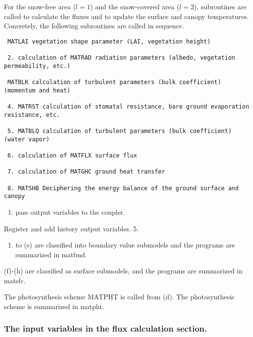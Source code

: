 For the snow-free area (\(l=1\)) and the snow-covered area (\(l=2\)),
subroutines are called to calculate the fluxes and to update the surface
and canopy temperatures. Concretely, the following subroutines are
called in sequence.

\begin{verbatim}
 MATLAI vegetation shape parameter (LAI, vegetation height)

 2. calculation of MATRAD radiation parameters (albedo, vegetation permeability, etc.)

 MATBLK calculation of turbulent parameters (bulk coefficient) (momentum and heat)

 4. MATRST calculation of stomatal resistance, bare ground evaporation resistance, etc.

 5. MATBLQ calculation of turbulent parameters (bulk coefficient) (water vapor)

 6. calculation of MATFLX surface flux

 7. calculation of MATGHC ground heat transfer

 8. MATSHB Deciphering the energy balance of the ground surface and canopy
\end{verbatim}

\begin{enumerate}
\def\labelenumi{\arabic{enumi}.}
\setcounter{enumi}{3}
\tightlist
\item
  pass output variables to the coupler.
\end{enumerate}

Register and add history output variables. 5.

\begin{enumerate}
\def\labelenumi{(\alph{enumi})}
\tightlist
\item
  to (e) are classified into boundary value submodels and the programs
  are summarized in matbnd.
\end{enumerate}

(f)-(h) are classified as surface submodels, and the programs are
summarized in matsfc.

The photosynthesis scheme MATPHT is called from (d). The photosynthesis
scheme is summarized in matpht.

\hypertarget{the-input-variables-in-the-flux-calculation-section.}{%
\subsubsection{The input variables in the flux calculation
section.}\label{the-input-variables-in-the-flux-calculation-section.}}


